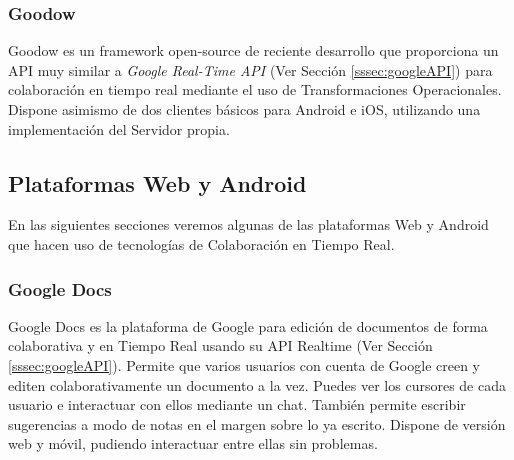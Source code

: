 	\subsubsection{Goodow}
	
	Goodow \cite{ref:goodow} es un framework open-source de reciente desarrollo que proporciona un API muy similar a \textit{Google Real-Time API} (Ver Sección \ref{sssec:googleAPI}) para colaboración en tiempo real mediante el uso de Transformaciones Operacionales. Dispone asimismo de dos clientes básicos para Android e iOS, utilizando una implementación del Servidor propia.	
	
	\subsection{Plataformas Web y Android}

	En las siguientes secciones veremos algunas de las plataformas Web y Android que hacen uso de tecnologías de Colaboración en Tiempo Real.	
	
	\subsubsection{Google Docs}
	
	Google Docs \cite{ref:google_docs} es la plataforma de Google para edición de documentos de forma colaborativa y en Tiempo Real usando su API Realtime (Ver Sección \ref{sssec:googleAPI}). Permite que varios usuarios con cuenta de Google creen y editen colaborativamente un documento a la vez. Puedes ver los cursores de cada usuario e interactuar con ellos mediante un chat. También permite escribir sugerencias a modo de notas en el margen sobre lo ya escrito. Dispone de versión web y móvil, pudiendo interactuar entre ellas sin problemas.
	
